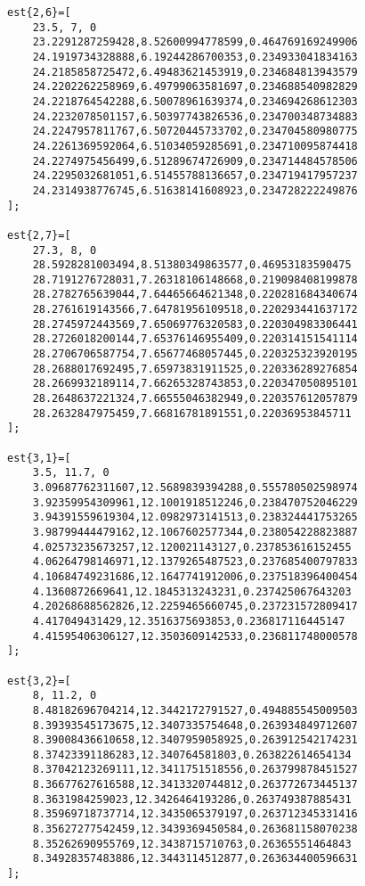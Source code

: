 \begin{verbatim}
est{2,6}=[
    23.5, 7, 0
    23.2291287259428,8.52600994778599,0.464769169249906
    24.1919734328888,6.19244286700353,0.234933041834163
    24.2185858725472,6.49483621453919,0.234684813943579
    24.2202262258969,6.49799063581697,0.234688540982829
    24.2218764542288,6.50078961639374,0.234694268612303
    24.2232078501157,6.50397743826536,0.234700348734883
    24.2247957811767,6.50720445733702,0.234704580980775
    24.2261369592064,6.51034059285691,0.234710095874418
    24.2274975456499,6.51289674726909,0.234714484578506
    24.2295032681051,6.51455788136657,0.234719417957237
    24.2314938776745,6.51638141608923,0.234728222249876
];

est{2,7}=[
    27.3, 8, 0
    28.5928281003494,8.51380349863577,0.46953183590475
    28.7191276728031,7.26318106148668,0.219098408199878
    28.2782765639044,7.64465664621348,0.220281684340674
    28.2761619143566,7.64781956109518,0.220293441637172
    28.2745972443569,7.65069776320583,0.220304983306441
    28.2726018200144,7.65376146955409,0.220314151541114
    28.2706706587754,7.65677468057445,0.220325323920195
    28.2688017692495,7.65973831911525,0.220336289276854
    28.2669932189114,7.66265328743853,0.220347050895101
    28.2648637221324,7.66555046382949,0.220357612057879
    28.2632847975459,7.66816781891551,0.22036953845711
];

est{3,1}=[
    3.5, 11.7, 0
    3.09687762311607,12.5689839394288,0.555780502598974
    3.92359954309961,12.1001918512246,0.238470752046229
    3.94391559619304,12.0982973141513,0.238324441753265
    3.98799444479162,12.1067602577344,0.238054228823887
    4.02573235673257,12.120021143127,0.237853616152455
    4.06264798146971,12.1379265487523,0.237685400797833
    4.10684749231686,12.1647741912006,0.237518396400454
    4.1360872669641,12.1845313243231,0.237425067643203
    4.20268688562826,12.2259465660745,0.237231572809417
    4.417049431429,12.3516375693853,0.236817116445147
    4.41595406306127,12.3503609142533,0.236811748000578
];

est{3,2}=[
    8, 11.2, 0
    8.48182696704214,12.3442172791527,0.494885545009503
    8.39393545173675,12.3407335754648,0.263934849712607
    8.39008436610658,12.3407959058925,0.263912542174231
    8.37423391186283,12.340764581803,0.263822614654134
    8.37042123269111,12.3411751518556,0.263799878451527
    8.36677627616588,12.3413320744812,0.263772673445137
    8.3631984259023,12.3426464193286,0.263749387885431
    8.35969718737714,12.3435065379197,0.263712345331416
    8.35627277542459,12.3439369450584,0.263681158070238
    8.35262690955769,12.3438715710763,0.26365551464843
    8.34928357483886,12.3443114512877,0.263634400596631
];


\end{verbatim}
